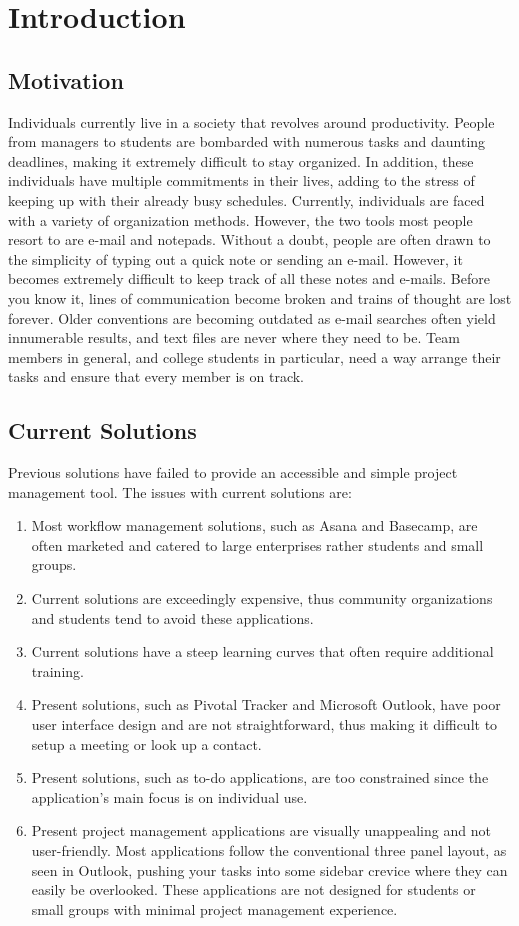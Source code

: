 \chapter{Introduction}

\section{Motivation}

Individuals currently live in a society that revolves around productivity. People from managers to students are bombarded with numerous tasks and daunting deadlines, making it extremely difficult to stay organized. In addition, these individuals have multiple commitments in their lives, adding to the stress of keeping up with their already busy schedules. Currently, individuals are faced with a variety of organization methods. However, the two tools most people resort to are e-mail and notepads. Without a doubt, people are often drawn to the simplicity of typing out a quick note or sending an e-mail. However, it becomes extremely difficult to keep track of all these notes and e-mails. Before you know it, lines of communication become broken and trains of thought are lost forever. Older conventions are becoming outdated as e-mail searches often yield innumerable results, and text files are never where they need to be. Team members in general, and college students in particular, need a way arrange their tasks and ensure that every member is on track.

\section{Current Solutions} 

Previous solutions have failed to provide an accessible and simple project management tool. The issues with current solutions are:
\begin{enumerate} 
	\item Most workflow management solutions, such as Asana and Basecamp, are often marketed and catered to large enterprises rather students and small groups. 
	\item Current solutions are exceedingly expensive, thus community organizations and students tend to avoid these applications. 
	\item Current solutions have a steep learning curves that often require additional training. 
	\item Present solutions, such as Pivotal Tracker and Microsoft Outlook, have poor user interface design and are not straightforward, thus making it difficult to setup a meeting or look up a contact. 
	\item Present solutions, such as to-do applications, are too constrained since the application's main focus is on individual use. 
	\item Present project management applications are visually unappealing and not user-friendly. Most applications follow the conventional three panel layout, as seen in Outlook, pushing your tasks into some sidebar crevice where they can easily be overlooked. These applications are not designed for students or small groups with minimal project management experience.
\end{enumerate}

